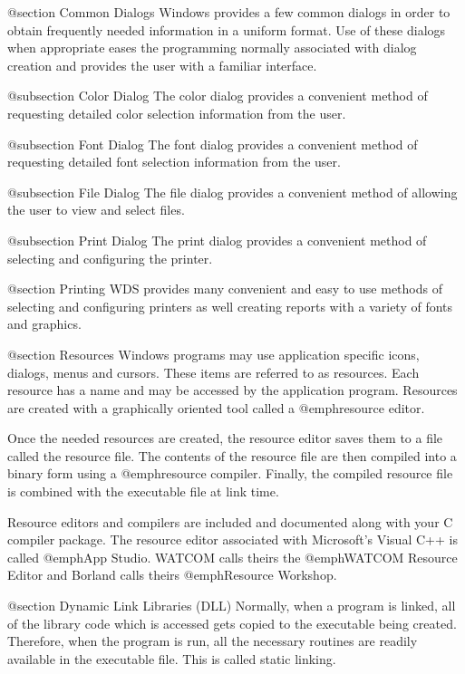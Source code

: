 @section Common Dialogs
Windows provides a few common dialogs in order to obtain frequently
needed information in a uniform format.  Use of these dialogs when
appropriate eases the programming normally associated with dialog
creation and provides the user with a familiar interface.

@subsection Color Dialog
The color dialog provides a convenient method of requesting detailed
color selection information from the user.

@subsection Font Dialog
The font dialog provides a convenient method of requesting detailed
font selection information from the user.

@subsection File Dialog
The file dialog provides a convenient method of allowing the user to
view and select files.

@subsection Print Dialog
The print dialog provides a convenient method of selecting and configuring
the printer.

@section Printing
WDS provides many convenient and easy to use methods of selecting and
configuring printers as well creating reports with a variety of fonts
and graphics.


@section Resources
Windows programs may use application specific icons, dialogs, menus and
cursors.  These items are referred to as resources.  Each resource has a
name and may be accessed by the application program.  Resources are
created with a graphically oriented tool called a @emph{resource editor}.

Once the needed resources are created, the resource editor saves them to
a file called the resource file.  The contents of the resource file are
then compiled into a binary form using a @emph{resource compiler}.
Finally, the compiled resource file is combined with the executable file
at link time.

Resource editors and compilers are included and documented along with
your C compiler package.  The resource editor associated with
Microsoft's Visual C++ is called @emph{App Studio}.  WATCOM calls theirs
the @emph{WATCOM Resource Editor} and Borland calls theirs
@emph{Resource Workshop}.



@section Dynamic Link Libraries (DLL)
Normally, when a program is linked, all of the library code which is
accessed gets copied to the executable being created.  Therefore, when
the program is run, all the necessary routines are readily available in
the executable file.  This is called static linking.

